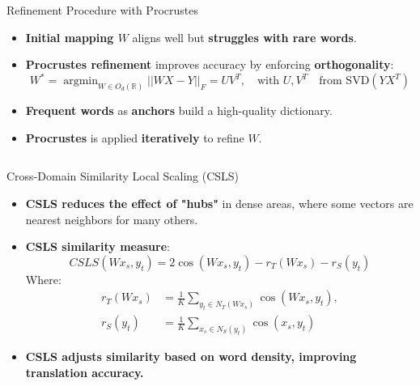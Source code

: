 \documentclass[final]{beamer}
\newlength{\onecolwid}
\newlength{\twocolwid}
\DeclareMathOperator*{\argmin}{argmin}
\newcommand{\longeqsize}{\fontsize{20.5}{26}\selectfont}
\begin{document}
\begin{frame}[t]
\begin{columns}[t]
\begin{column}{\twocolwid}
\begin{column}{\onecolwid}
	\begin{block}{Refinement Procedure with Procrustes}
	    \begin{itemize}
	        \item \textbf{Initial mapping \( W \)} aligns well but \textbf{struggles with rare words}.
	        \item \textbf{Procrustes refinement} improves accuracy by enforcing \textbf{orthogonality}:
	        \longeqsize
	        \[
	            W^* = \argmin_{W \in O_d(\mathbb{R})} || W X - Y ||_F = UV^{T}, \quad \text{with } U,V^T\quad \text{from SVD}(YX^T) 
	        \]
	        \normalsize
	\item \textbf{Frequent words} as \textbf{anchors} build a high-quality dictionary.
	\item \textbf{Procrustes} is applied \textbf{iteratively} to refine \( W \).
	    \end{itemize}
	\end{block}
\end{column}
\begin{column}{\onecolwid}
	\begin{block}{Cross-Domain Similarity Local Scaling (CSLS)}
	    \begin{itemize}
	        \item \textbf{CSLS reduces the effect of "hubs"} in dense areas, where some vectors are nearest neighbors for many others.
	\item \textbf{CSLS similarity measure}:
	\[
	    CSLS(W x_s, y_t) = 2 \cos(W x_s, y_t) - r_T(W x_s) - r_S(y_t)
	\]
	Where:
	\begin{align*}
	    r_T(W x_s) &= \frac{1}{K} \sum_{y_t \in N_T(W x_s)} \cos(W x_s, y_t), \\
	    r_S(y_t) &= \frac{1}{K} \sum_{x_s \in N_S(y_t)} \cos(x_s, y_t)
	\end{align*}
	\item \textbf{CSLS adjusts similarity based on word density, improving translation accuracy.}
	
	    \end{itemize}
	\end{block}
\end{column}



\end{column}
\end{columns}
\end{frame}
\end{document}
